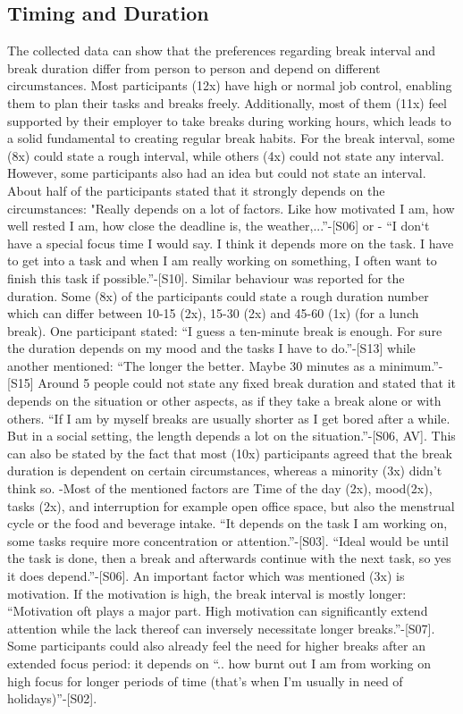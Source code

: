 \documentclass{hasel_thesis}
\begin{document}
\subsection{Timing and Duration}
The collected data can show that the preferences regarding break interval and break duration differ from person to person and depend on different circumstances. Most participants (12x) have high or normal job control, enabling them to plan their tasks and breaks freely. Additionally, most of them (11x) feel supported by their employer to take breaks during working hours, which leads to a solid fundamental to creating regular break habits. For the break interval, some (8x) could state a rough interval, while others (4x) could not state any interval. However, some participants also had an idea but could not state an interval. About half of the participants stated that it strongly depends on the circumstances: "Really depends on a lot of factors. Like how motivated I am, how well rested I am, how close the deadline is, the weather,...”-[S06] or -	“I don‘t have a special focus time I would say. I think it depends more on the task. I have to get into a task and when I am really working on something, I often want to finish this task if possible.”-[S10]. Similar behaviour was reported for the duration. Some (8x) of the participants could state a rough duration number which can differ between 10-15 (2x), 15-30 (2x) and 45-60 (1x) (for a lunch break). One participant stated: “I guess a ten-minute break is enough. For sure the duration depends on my mood and the tasks I have to do.”-[S13] while another mentioned: “The longer the better. Maybe 30 minutes as a minimum.”-[S15] Around 5 people could not state any fixed break duration and stated that it depends on the situation or other aspects, as if they take a break alone or with others. “If I am by myself breaks are usually shorter as I get bored after a while. But in a social setting, the length depends a lot on the situation.”-[S06, AV]. This can also be stated by the fact that most (10x) participants agreed that the break duration is dependent on certain circumstances, whereas a minority (3x) didn't think so. -Most of the mentioned factors are Time of the day (2x), mood(2x), tasks (2x), and interruption for example open office space, but also the menstrual cycle or the food and beverage intake. “It depends on the task I am working on, some tasks require more concentration or attention.”-[S03]. “Ideal would be until the task is done, then a break and afterwards continue with the next task, so yes it does depend.”-[S06]. An important factor which was mentioned (3x) is motivation. If the motivation is high, the break interval is mostly longer: “Motivation oft plays a major part. High motivation can significantly extend attention while the lack thereof can inversely necessitate longer breaks.”-[S07]. Some participants could also already feel the need for higher breaks after an extended focus period: it depends on “.. how burnt out I am from working on high focus for longer periods of time (that's when I'm usually in need of holidays)”-[S02].
\end{document}
